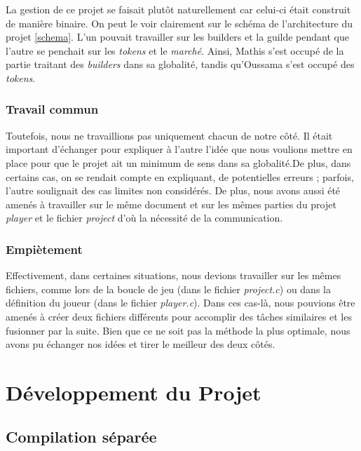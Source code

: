 \documentclass{article}
\begin{document}
\hspace{1em}La gestion de ce projet se faisait plutôt naturellement car celui-ci était construit de manière binaire. On peut le voir clairement sur le schéma de l'architecture du projet \ref{schema}. L'un pouvait travailler sur les builders et la guilde pendant que l'autre se penchait sur les \emph{tokens} et le \emph{marché}. Ainsi, Mathis s'est occupé de la partie traitant des \emph{builders} dans sa globalité, tandis qu'Oussama s'est occupé des \emph{tokens}.
\subsubsection{Travail commun}

\hspace{1em} Toutefois, nous ne travaillions pas uniquement chacun de notre côté. Il était important d'échanger pour expliquer à l'autre l'idée que nous voulions mettre en place pour que le projet ait un minimum de sens dans sa globalité.De plus, dans certains cas, on se rendait compte en expliquant, de potentielles erreurs ; parfois, l'autre soulignait des cas limites non considérés. De plus, nous avons aussi été amenés à travailler sur le même document et sur les mêmes parties du projet \emph{player} et le fichier \emph{project} d'où la nécessité de la communication. 


\subsubsection{Empiètement}

\hspace{1em} Effectivement, dans certaines situations, nous devions travailler sur les mêmes fichiers, comme lors de la boucle de jeu (dans le fichier \emph{project.c}) ou dans la définition du joueur (dans le fichier \emph{player.c}). Dans ces cas-là, nous pouvions être amenés à créer deux fichiers différents pour accomplir des tâches similaires et les fusionner par la suite. Bien que ce ne soit pas la méthode la plus optimale, nous avons pu échanger nos idées et tirer le meilleur des deux côtés. 

\section{Développement du Projet}
\vspace{1em}
\subsection{Compilation séparée}
\end{document}
